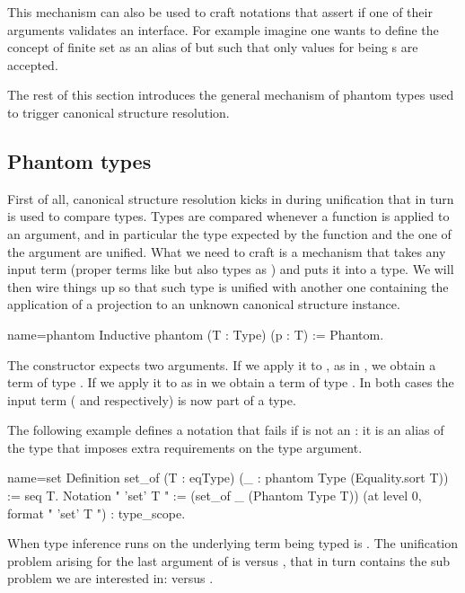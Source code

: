 This mechanism can also be used to craft notations that assert
if one of their arguments validates an interface.  For example
imagine one wants to define the concept of finite set as an
alias of  but such that only values for  being
s are accepted.

The rest of this section introduces the general mechanism of phantom
types used to trigger canonical structure resolution.

\subsection{Phantom types}

First of all, canonical structure resolution kicks in during
unification that in turn is used to compare types.  Types are
compared whenever a function is applied to an argument, and in
particular the type expected by the function and the one of the
argument are unified.  What we need to craft is a mechanism that
takes any input term (proper terms like  but also types as )
and puts it into a type.  We will then wire things up so that such
type is unified with another one containing the application of
a projection to an unknown canonical structure instance.

\begin{coq}{name=phantom}{}
Inductive phantom (T : Type) (p : T) := Phantom.
\end{coq}

The  constructor expects two arguments.  If we apply
it to , as in , we obtain a term
of type .  If we apply it to  as
in  we obtain a term
of type .  In both cases the
input term ( and  respectively) is now part of a type.

The following example defines a notation  that
fails if  is not an : it is an alias of the type
 that imposes extra requirements on the type argument.

\begin{coq}{name=set}{}
Definition set_of (T : eqType) (_ : phantom Type (Equality.sort T)) := seq T.
Notation "{ 'set' T }" := (set_of _ (Phantom Type T))
  (at level 0, format "{ 'set'  T }") : type_scope.
\end{coq}

When type inference runs on  the underlying term being
typed is .
The unification problem arising for the last argument of 
is  versus
, that in turn contains the sub problem
we are interested in:  versus .

